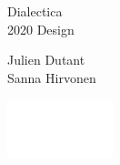 \documentclass[10pt,
	paper=14cm:21cm,
	DIV=12,
	headinclude=yes,
	footinclude=no,
	twoside=no]{scrartcl}
\begin{document}
{ %
\thispagestyle{empty}
\setlength\parindent{0pt}
\afterpage{\restorepagecolor}
\color{white}
\begin{raggedleft}

Dialectica \\
2020 Design 

\vskip 3pc

Julien Dutant \\
Sanna Hirvonen\\

\end{raggedleft}

\vfill

\begin{centering}

\includegraphics[height=48pt]{DialOA_logo_WhiteTransp}

\end{centering}

} %
\end{document}
